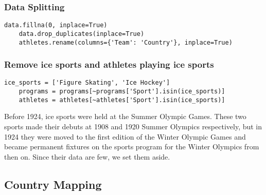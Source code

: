 \subsubsection{Data Splitting}

\begin{lstlisting}[caption=Data Splitting]
    data.fillna(0, inplace=True)
    data.drop_duplicates(inplace=True)
    athletes.rename(columns={'Team': 'Country'}, inplace=True)
    \end{lstlisting}

\subsubsection{Remove ice sports and athletes playing ice sports}
\begin{lstlisting}[caption=Data Splitting]
    ice_sports = ['Figure Skating', 'Ice Hockey']
    programs = programs[~programs['Sport'].isin(ice_sports)]
    athletes = athletes[~athletes['Sport'].isin(ice_sports)]
\end{lstlisting}
Before 1924, ice sports were held at the Summer Olympic Games. These two sports made their debuts at 1908 and 1920 Summer Olympics respectively, but in 1924 they were moved to the first edition of the Winter Olympic Games and became permanent fixtures on the sports program for the Winter Olympics from then on. Since their data are few, we set them aside.
\subsection{Country Mapping}